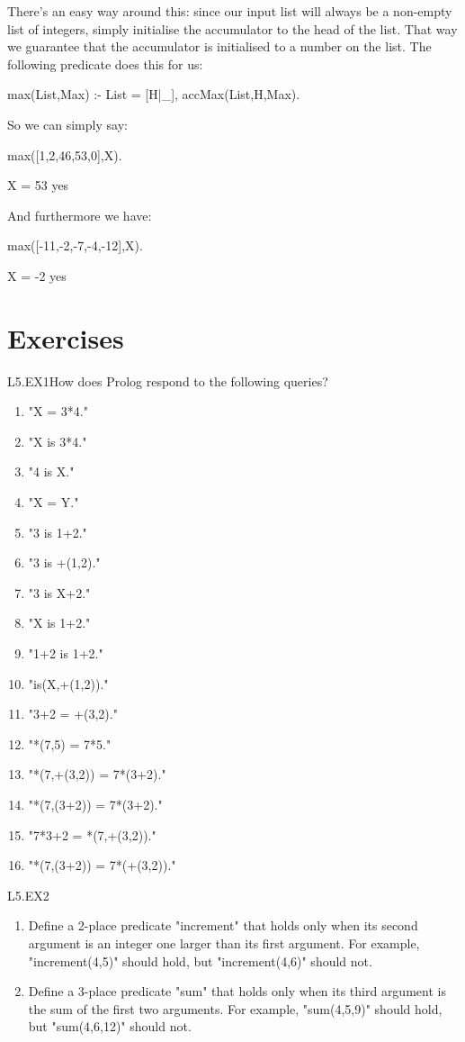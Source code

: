 There's an easy way around this: since our input list will always be a
non-empty list of integers, simply initialise the accumulator to the
head of the list.  That way we guarantee that the accumulator is
initialised to a number on the list.  The following predicate does
this for us:
\begin{LPNcodedisplay}
max(List,Max) :-
     List = [H|_],
     accMax(List,H,Max).
\end{LPNcodedisplay}
So we can simply say:
\begin{LPNcodedisplay}
max([1,2,46,53,0],X).

X = 53
yes
\end{LPNcodedisplay}
And furthermore we have:
\begin{LPNcodedisplay}
max([-11,-2,-7,-4,-12],X).

X = -2
yes
\end{LPNcodedisplay}


\newpage
\section{Exercises}\label{SEC.L5.EXERCISES}

\begin{LPNexercise}{L5.EX1}How does Prolog respond to the following queries?
\begin{enumerate}
\item{}"X = 3*4."
\item{}"X is 3*4."
\item{}"4 is X."
\item{}"X = Y."
\item{}"3 is 1+2."
\item{}"3 is +(1,2)."
\item{}"3 is X+2."
\item{}"X is 1+2."
\item{}"1+2 is 1+2."
\item{}"is(X,+(1,2))."
\item{}"3+2 = +(3,2)."
\item{}"*(7,5) = 7*5."
\item{}"*(7,+(3,2)) = 7*(3+2)."
\item{}"*(7,(3+2)) = 7*(3+2)."
\item{}"7*3+2 = *(7,+(3,2))."
\item{}"*(7,(3+2)) = 7*(+(3,2))."
\end{enumerate}
\end{LPNexercise}
\begin{LPNexercise}{L5.EX2}\begin{enumerate}
\item{}Define a 2-place predicate "increment" that holds only when its
second argument is an integer one larger than its first argument.  For
example, "increment(4,5)" should hold, but "increment(4,6)"
should not.
\item{}Define a 3-place predicate "sum" that holds only when its third
argument is the sum of the first two arguments. For example,
"sum(4,5,9)" should hold, but "sum(4,6,12)" should
not.
\end{enumerate}
\end{LPNexercise}

